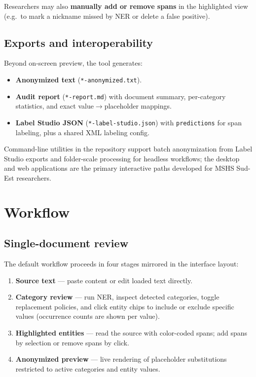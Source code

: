 \documentclass[11pt,a4paper]{article}
\begin{document}
Researchers may also \textbf{manually add or remove spans} in the highlighted view
(e.g.\ to mark a nickname missed by NER or delete a false positive).

\subsection{Exports and interoperability}

Beyond on-screen preview, the tool generates:
\begin{itemize}[noitemsep]
  \item \textbf{Anonymized text} (\texttt{*-anonymized.txt}).
  \item \textbf{Audit report} (\texttt{*-report.md}) with document summary, per-category
        statistics, and exact value$\rightarrow$placeholder mappings.
  \item \textbf{Label Studio JSON} (\texttt{*-label-studio.json}) with
        \texttt{predictions} for span labeling, plus a shared XML labeling config.
\end{itemize}

Command-line utilities in the repository support batch anonymization from Label
Studio exports and folder-scale processing for headless workflows; the desktop
and web applications are the primary interactive paths developed for MSHS Sud-Est researchers.

\section{Workflow}
\label{sec:workflow}

\subsection{Single-document review}

The default workflow proceeds in four stages mirrored in the interface layout:
\begin{enumerate}
  \item \textbf{Source text} --- paste content or edit loaded text directly.
  \item \textbf{Category review} --- run NER, inspect detected categories, toggle
        replacement policies, and click entity chips to include or exclude specific
        values (occurrence counts are shown per value).
  \item \textbf{Highlighted entities} --- read the source with color-coded spans;
        add spans by selection or remove spans by click.
  \item \textbf{Anonymized preview} --- live rendering of placeholder substitutions
        restricted to active categories and entity values.
\end{enumerate}
\end{document}
